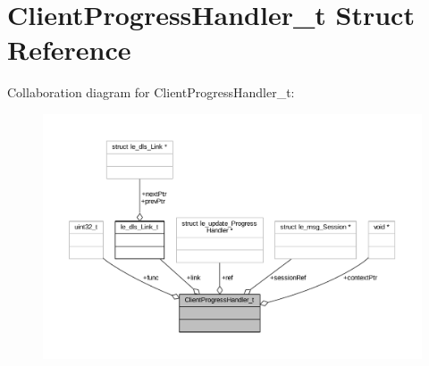 \hypertarget{struct_client_progress_handler__t}{}\section{Client\+Progress\+Handler\+\_\+t Struct Reference}
\label{struct_client_progress_handler__t}


Collaboration diagram for Client\+Progress\+Handler\+\_\+t\+:
\nopagebreak
\begin{figure}[H]
\begin{center}
\leavevmode
\includegraphics[width=350pt]{struct_client_progress_handler__t__coll__graph}
\end{center}
\end{figure}
